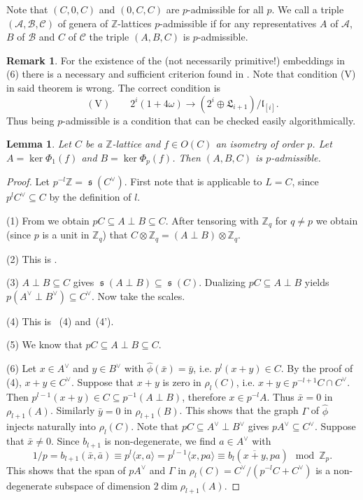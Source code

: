 \documentclass[a4paper]{amsart}
\theoremstyle{definition}
\newtheorem{remark}[definition]{Remark}
\theoremstyle{plain}
\newtheorem{lemma}[definition]{Lemma}
\DeclareMathOperator{\scale}{\mathfrak{s}}
\newcommand{\ZZ}{\mathbb{Z}}
\newcommand{\C}{\mathcal{C}}
\newcommand{\B}{\mathcal{B}}
\newcommand{\A}{\mathcal{A}}
\newcommand{\sprodb}[2]{\langle #1, #2 \rangle}
\begin{document}
Note that $(C,0,C)$ and $(0,C,C)$ are $p$-admissible for all $p$.
We call a triple $(\A,\B,\C)$ of genera of $\ZZ$-lattices $p$-admissible if for any representatives $A$ of $\A$, $B$ of $\B$ and $C$ of $\C$ the triple $(A,B,C)$ is $p$-admissible.

\begin{remark}
 For the existence of the (not necessarily primitive!) embeddings in (6) there is a necessary and sufficient criterion found in \cite[Theorem 3]{omeara1958}. Note that condition (V) in said theorem is wrong.
 The correct condition is
 \[(\mathrm{V}) \qquad 2^i (1+4 \omega) \to (2^i \oplus \mathfrak{L}_{i+1})/ \mathfrak{l}_{[i]}.\]
 Thus being $p$-admissible is a condition that can be checked easily algorithmically.
\end{remark}

\begin{lemma}\label{ispadmissible}
 Let $C$ be a $\ZZ$-lattice and $f \in O(C)$ an isometry of order $p$.
 Let $A = \ker \Phi_1(f)$ and $B = \ker \Phi_p(f)$.
 Then $(A,B,C)$ is $p$-admissible.
\end{lemma}
\begin{proof}
  Let $p^{-l}\ZZ = \scale(C^\vee)$.
  First note that  is applicable to $L = C$, since $p^{l}C^\vee \subseteq C$ by the definition of $l$.

(1) From  we obtain $pC \subseteq A\perp B \subseteq C$. After tensoring with $\ZZ_q$ for $q\neq p$ we obtain (since $p$ is a unit in $\ZZ_q$) that $C \otimes \ZZ_q = (A\perp B)\otimes \ZZ_q$.

(2) This is .

(3) $A \perp B \subseteq C$ gives $\scale(A\perp B) \subseteq \scale(C)$.
Dualizing $pC \subseteq A\perp B$ yields $p (A^\vee \perp B^\vee) \subseteq C^\vee$. Now take the scales.

(4) This is ~(4) and~(4').

(5) We know that $pC \subseteq A\perp B \subseteq C$.

(6) Let $x \in A^\vee$ and $y \in B^\vee$ with $\hat \phi(\bar x) = \bar y$, i.e. $p^l(x+y)\in C$.
By the proof of  (4), $x+y \in C^\vee$.
Suppose that $x+y$ is zero in $\rho_l(C)$, i.e. $x+y \in p^{-l+1}C \cap C^\vee$. Then $p^{l-1} (x+y) \in C\subseteq p^{-1}(A\perp B)$, therefore
$x \in p^{-l} A$. Thus $\bar x = 0$ in $\rho_{l+1}(A)$. Similarly $\bar y = 0$ in $\rho_{l+1}(B)$. This shows that
the graph $\Gamma$ of $\hat \phi$ injects naturally into $\rho_l(C)$.
Note that $p C \subseteq A^\vee \perp B^\vee$ gives $p A^\vee \subseteq C^\vee$.
Suppose that $\bar x \neq 0$.
Since $b_{l+1}$ is non-degenerate, we find $a \in A^\vee$ with
\[1/p = b_{l+1}(\bar x, \bar a)\equiv  p^l \sprodb{x}{a} = p^{l-1}\sprodb{x}{pa} \equiv b_{l}(\overline{x+y},p a) \mod \ZZ_p.\]
This shows that the span of $p A^\vee$ and
$\Gamma$ in $\rho_l(C)=C^\vee/(p^{-l}C + C^\vee)$ is a non-degenerate subspace of dimension $2 \dim \rho_{l+1}(A)$.
\end{proof}
\end{document}
